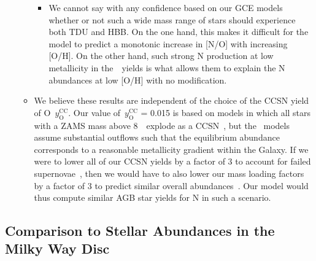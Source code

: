 \documentclass[ms.tex]{subfiles}
\begin{document}
\begin{itemize}
\begin{itemize}
\begin{itemize}
			\item We cannot say with any confidence based on our GCE models 
			whether or not such a wide mass range of stars should experience 
			both TDU and HBB. 
			On the one hand, this makes it difficult for the model to predict a 
			monotonic increase in [N/O] with increasing [O/H]. 
			On the other hand, such strong N production at low metallicity in 
			the~\karakas~yields is what allows them to explain the N abundances 
			at low [O/H] with no modification. 
		\end{itemize} 

		\item {\color{red} 
		We believe these results are independent of the choice of the 
		CCSN yield of O~$y_\text{O}^\text{CC}$. 
		Our value of~$y_\text{O}^\text{CC}$ = 0.015 is based on models in which 
		all stars with a ZAMS mass above 8~\msun~explode as a 
		CCSN~\citep[e.g.][]{Chieffi2013}, but the~\citet{Johnson2021} models 
		assume substantial outflows such that the equilibrium abundance 
		corresponds to a reasonable metallicity gradient within the Galaxy. 
		If we were to lower all of our CCSN yields by a factor of 3 to account 
		for failed supernovae~\citep[e.g.][]{Sukhbold2016}, then we would have 
		to also lower our mass loading factors by a factor of 3 to predict 
		similar overall abundances~\citep{Weinberg2017}. 
		Our model would thus compute similar AGB star yields for N in such a 
		scenario. 
		} 

	\end{itemize} 
\end{itemize} 

\subsection{Comparison to Stellar Abundances in the Milky Way Disc} 
\label{sec:results:vincenzo_comp} 
\end{document}

